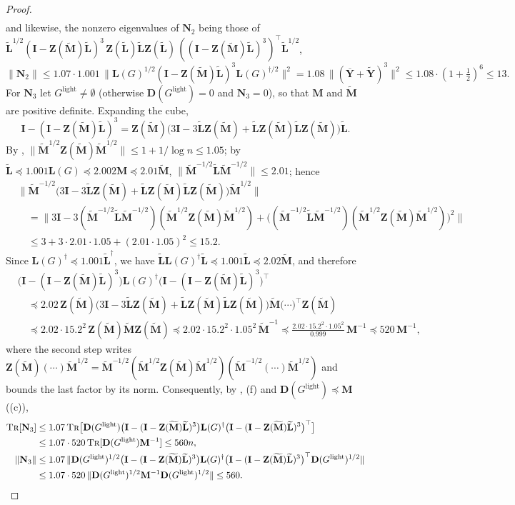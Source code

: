 \documentclass[11pt]{article}
\theoremstyle{remark}
\newcommand{\DD}{\mathbf D}
\newcommand{\II}{\mathbf I}
\newcommand{\LL}{\mathbf L}
\newcommand{\LLtil}{{\widetilde{\LL}}}
\newcommand{\MM}{\mathbf M}
\newcommand{\MMtil}{{\widetilde{\MM}}}
\newcommand{\NN}{\mathbf N}
\newcommand{\YY}{\mathbf{Y}}
\newcommand{\YYbar}{{\overline{\YY}}}
\newcommand{\YYtil}{{\widetilde{\YY}}}
\newcommand{\ZZ}{\mathbf Z}
\newcommand{\Gl}{G^{\mathrm{light}}}
\newcommand{\norm}[1]{\lVert#1\rVert}
\newcommand{\tr}{\textsc{Tr}}
\begin{document}
\begin{proof}
\begin{align*}
\end{align*}
and likewise, the nonzero eigenvalues of $\NN_2$ being those of
$\LLtil^{1/2}(\II-\ZZ(\MMtil)\LLtil)^{3}\,\ZZ(\LLtil)\LLtil\ZZ(\LLtil)\,((\II-\ZZ(\MMtil)\LLtil)^{3})^{\top}\LLtil^{1/2}$,
\[
\norm{\NN_2}\le1.07\cdot1.001\,\norm{\LL(G)^{1/2}(\II-\ZZ(\MMtil)\LLtil)^{3}\LL(G)^{\dag/2}}^{2}
=1.08\,\norm{(\YYbar+\YYtil)^{3}}^{2}\le1.08\cdot(1+\tfrac12)^{6}\le13 .
\]
For $\NN_3$ let $\Gl\neq\emptyset$ (otherwise $\DD(\Gl)=0$ and $\NN_3=0$),
so that $\MM$ and $\MMtil$ are positive definite.
Expanding the cube,
\[
\II-(\II-\ZZ(\MMtil)\LLtil)^{3}
=\ZZ(\MMtil)\bigl(3\II-3\LLtil\ZZ(\MMtil)+\LLtil\ZZ(\MMtil)\LLtil\ZZ(\MMtil)\bigr)\LLtil .
\]
By , $\norm{\MMtil^{1/2}\ZZ(\MMtil)\MMtil^{1/2}}\le1+1/\log n\le1.05$;
by $\LLtil\preceq1.001\LL(G)\preceq2.002\MM\preceq2.01\MMtil$,
$\norm{\MMtil^{-1/2}\LLtil\MMtil^{-1/2}}\le2.01$; hence
\begin{align*}
&\norm{\MMtil^{-1/2}\bigl(3\II-3\LLtil\ZZ(\MMtil)+\LLtil\ZZ(\MMtil)\LLtil\ZZ(\MMtil)\bigr)\MMtil^{1/2}}\\
&\quad=\norm{3\II-3(\MMtil^{-1/2}\LLtil\MMtil^{-1/2})(\MMtil^{1/2}\ZZ(\MMtil)\MMtil^{1/2})
+\bigl((\MMtil^{-1/2}\LLtil\MMtil^{-1/2})(\MMtil^{1/2}\ZZ(\MMtil)\MMtil^{1/2})\bigr)^{2}}\\
&\quad\le3+3\cdot2.01\cdot1.05+(2.01\cdot1.05)^{2}\le15.2 .
\end{align*}
Since $\LL(G)^{\dag}\preceq1.001\LLtil^{\dag}$, we have
$\LLtil\LL(G)^{\dag}\LLtil\preceq1.001\LLtil\preceq2.02\MMtil$, and therefore
\begin{align*}
&\bigl(\II-(\II-\ZZ(\MMtil)\LLtil)^{3}\bigr)\LL(G)^{\dag}\bigl(\II-(\II-\ZZ(\MMtil)\LLtil)^{3}\bigr)^{\top}\\
&\quad\preceq2.02\,\ZZ(\MMtil)\bigl(3\II-3\LLtil\ZZ(\MMtil)+\LLtil\ZZ(\MMtil)\LLtil\ZZ(\MMtil)\bigr)\MMtil\bigl(\cdots\bigr)^{\top}\ZZ(\MMtil)\\
&\quad\preceq2.02\cdot15.2^{2}\,\ZZ(\MMtil)\MMtil\ZZ(\MMtil)
\preceq2.02\cdot15.2^{2}\cdot1.05^{2}\,\MMtil^{-1}
\preceq\frac{2.02\cdot15.2^{2}\cdot1.05^{2}}{0.999}\,\MM^{-1}
\preceq520\,\MM^{-1},
\end{align*}
where the second step writes
$\ZZ(\MMtil)(\cdots)\MMtil^{1/2}=\MMtil^{-1/2}(\MMtil^{1/2}\ZZ(\MMtil)\MMtil^{1/2})(\MMtil^{-1/2}(\cdots)\MMtil^{1/2})$
and bounds the last factor by its norm.
Consequently, by , (f) and
$\DD(\Gl)\preceq\MM$ ((c)),
\begin{align*}
\tr[\NN_3]
&\le1.07\,\tr\bigl[\DD(\Gl)\bigl(\II-(\II-\ZZ(\MMtil)\LLtil)^{3}\bigr)\LL(G)^{\dag}\bigl(\II-(\II-\ZZ(\MMtil)\LLtil)^{3}\bigr)^{\top}\bigr]\\
&\le1.07\cdot520\,\tr[\DD(\Gl)\MM^{-1}]\le560n,\\
\norm{\NN_3}
&\le1.07\,\norm{\DD(\Gl)^{1/2}\bigl(\II-(\II-\ZZ(\MMtil)\LLtil)^{3}\bigr)\LL(G)^{\dag}\bigl(\II-(\II-\ZZ(\MMtil)\LLtil)^{3}\bigr)^{\top}\DD(\Gl)^{1/2}}\\
&\le1.07\cdot520\,\norm{\DD(\Gl)^{1/2}\MM^{-1}\DD(\Gl)^{1/2}}\le560 .
\end{align*}


\end{proof}
\end{document}
